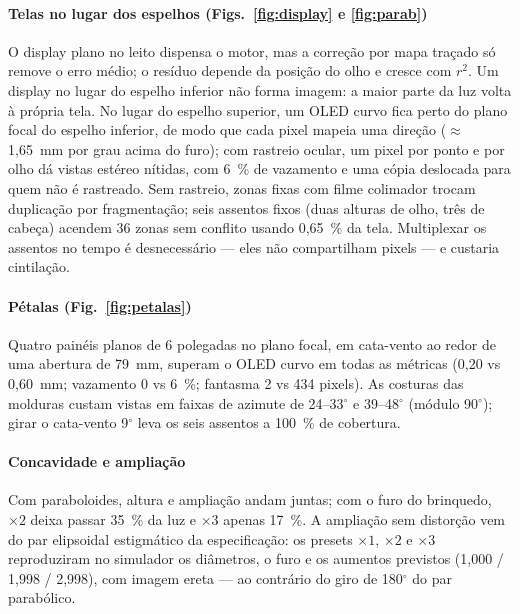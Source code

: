 \documentclass[journal,10pt]{IEEEtran}
\begin{document}
\paragraph{Telas no lugar dos espelhos (Figs.~\ref{fig:display} e \ref{fig:parab})} O display plano no leito dispensa o motor, mas a corre\c{c}\~ao por mapa tra\c{c}ado s\'o remove o erro m\'edio; o res\'iduo depende da posi\c{c}\~ao do olho e cresce com $r^2$. Um display no lugar do espelho inferior n\~ao forma imagem: a maior parte da luz volta \`a pr\'opria tela. No lugar do espelho superior, um OLED curvo fica perto do plano focal do espelho inferior, de modo que cada pixel mapeia uma dire\c{c}\~ao ($\approx$1,65~mm por grau acima do furo); com rastreio ocular, um pixel por ponto e por olho d\'a vistas est\'ereo n\'itidas, com 6~\% de vazamento e uma c\'opia deslocada para quem n\~ao \'e rastreado. Sem rastreio, zonas fixas com filme colimador trocam duplica\c{c}\~ao por fragmenta\c{c}\~ao; seis assentos fixos (duas alturas de olho, tr\^es de cabe\c{c}a) acendem 36 zonas sem conflito usando 0,65~\% da tela. Multiplexar os assentos no tempo \'e desnecess\'ario --- eles n\~ao compartilham pixels --- e custaria cintila\c{c}\~ao.

\paragraph{P\'etalas (Fig.~\ref{fig:petalas})} Quatro pain\'eis planos de 6 polegadas no plano focal, em cata-vento ao redor de uma abertura de 79~mm, superam o OLED curvo em todas as m\'etricas (0,20 vs 0,60~mm; vazamento 0 vs 6~\%; fantasma 2 vs 434 pixels). As costuras das molduras custam vistas em faixas de azimute de 24--33$^\circ$ e 39--48$^\circ$ (m\'odulo 90$^\circ$); girar o cata-vento 9$^\circ$ leva os seis assentos a 100~\% de cobertura.

\paragraph{Concavidade e amplia\c{c}\~ao} Com paraboloides, altura e amplia\c{c}\~ao andam juntas; com o furo do brinquedo, $\times2$ deixa passar 35~\% da luz e $\times3$ apenas 17~\%. A amplia\c{c}\~ao sem distor\c{c}\~ao vem do par elipsoidal estigm\'atico da especifica\c{c}\~ao: os presets $\times1$, $\times2$ e $\times3$ reproduziram no simulador os di\^ametros, o furo e os aumentos previstos (1,000 / 1,998 / 2,998), com imagem ereta --- ao contr\'ario do giro de 180$^\circ$ do par parab\'olico.
\end{document}
